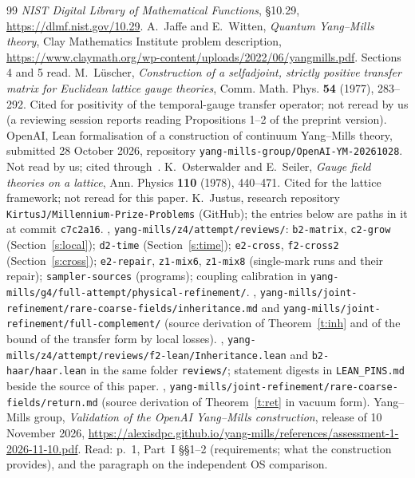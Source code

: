 \begin{thebibliography}{99}
 \emph{NIST Digital Library of Mathematical Functions}, \S10.29, \url{https://dlmf.nist.gov/10.29}.
 A.~Jaffe and E.~Witten, \emph{Quantum Yang--Mills theory}, Clay Mathematics Institute problem
description, \url{https://www.claymath.org/wp-content/uploads/2022/06/yangmills.pdf}. Sections 4 and 5 read.
 M.~L\"uscher, \emph{Construction of a selfadjoint, strictly positive transfer matrix for
Euclidean lattice gauge theories}, Comm. Math. Phys. \textbf{54} (1977), 283--292. Cited for positivity of the
temporal-gauge transfer operator; not reread by us (a reviewing session reports reading Propositions 1--2 of
the preprint version).
 OpenAI, Lean formalisation of a construction of continuum Yang--Mills theory, submitted
28 October 2026, repository \texttt{yang-mills-group/OpenAI-YM-20261028}. Not read by us; cited through~\cite{YMG}.
 K.~Osterwalder and E.~Seiler, \emph{Gauge field theories on a lattice}, Ann. Physics
\textbf{110} (1978), 440--471. Cited for the lattice framework; not reread for this paper.
 K.~Justus, research repository \texttt{KirtusJ/Millennium-Prize-Problems} (GitHub); the
entries below are paths in it at commit \texttt{c7c2a16}.
 \cite{Repo}, \texttt{yang-mills/z4/attempt/reviews/}: \texttt{b2-matrix}, \texttt{c2-grow}
(Section~\ref{s:local}); \texttt{d2-time} (Section~\ref{s:time}); \texttt{e2-cross}, \texttt{f2-cross2}
(Section~\ref{s:cross}); \texttt{e2-repair}, \texttt{z1-mix6}, \texttt{z1-mix8} (single-mark runs and their
repair); \texttt{sampler-sources} (programs); coupling calibration in
\texttt{yang-mills/g4/full-attempt/physical-refinement/}.
 \cite{Repo}, \texttt{yang-mills/joint-refinement/rare-coarse-fields/inheritance.md} and
\texttt{yang-mills/joint-refinement/full-complement/} (source derivation of Theorem~\ref{t:inh} and of the
bound of the transfer form by local losses).
 \cite{Repo}, \texttt{yang-mills/z4/attempt/reviews/f2-lean/Inheritance.lean} and
\texttt{b2-haar/haar.lean} in the same folder \texttt{reviews/}; statement digests in \texttt{LEAN\_PINS.md}
beside the source of this paper.
 \cite{Repo}, \texttt{yang-mills/joint-refinement/rare-coarse-fields/return.md} (source
derivation of Theorem~\ref{t:ret} in vacuum form).
 Yang--Mills group, \emph{Validation of the OpenAI Yang--Mills construction}, release of
10 November 2026, \url{https://alexisdpc.github.io/yang-mills/references/assessment-1-2026-11-10.pdf}. Read:
p.~1, Part~I \S\S1--2 (requirements; what the construction provides), and the paragraph on the independent
OS comparison.
\end{thebibliography}

